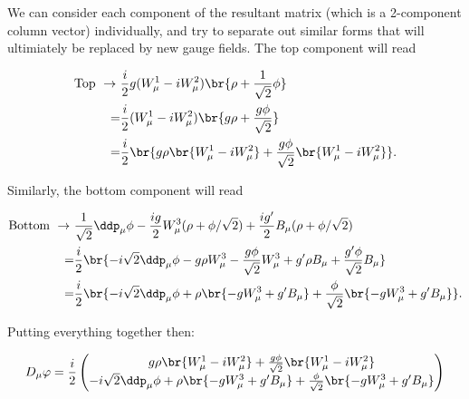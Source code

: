 We can consider each component of the resultant matrix (which is a 2-component column vector) individually, and try to separate out similar forms that will ultimiately be replaced by new gauge fields. The top component will read

\begin{align}
  \mathrm{Top} \ \rightarrow\ &  \frac{i}{2}g (W_\mu^1 - iW_\mu^2)\br{\rho + \frac{1}{\sqrt{2}}\phi} \\
  =& \frac{i}{2} (W_\mu^1 - iW_\mu^2)\br{g\rho + \frac{g\phi}{\sqrt{2}}} \\
  =& \frac{i}{2}\br{g\rho \br{W_\mu^1 - iW_\mu^2} + \frac{g\phi}{\sqrt{2}} \br{W_\mu^1 - iW_\mu^2}}.
\end{align}

Similarly, the bottom component will read

\begin{align}
  \mathrm{Bottom} \ \rightarrow\ & \frac{1}{\sqrt{2}}\ddp_\mu\phi - \frac{ig}{2}W_\mu^3(\rho + \phi/\sqrt{2}) + \frac{ig'}{2}B_\mu(\rho + \phi/\sqrt{2}) \\
  =& \frac{i}{2}\br{-i\sqrt{2}\ddp_\mu\phi - g\rho W_\mu^3 - \frac{g\phi}{\sqrt{2}}W_\mu^3 + g'\rho B_\mu + \frac{g'\phi}{\sqrt{2}}B_\mu} \\
  =& \frac{i}{2}\br{-i\sqrt{2}\ddp_\mu\phi + \rho\br{-gW_\mu^3 + g'B_\mu} + \frac{\phi}{\sqrt{2}}\br{-gW_\mu^3 + g'B_\mu}}.
\end{align}

Putting everything together then:

\begin{equation}
  D_\mu\varphi = \frac{i}{2} \begin{pmatrix}g\rho \br{W_\mu^1 - iW_\mu^2} + \frac{g\phi}{\sqrt{2}} \br{W_\mu^1 - iW_\mu^2} \\ -i\sqrt{2}\ddp_\mu\phi + \rho\br{-gW_\mu^3 + g'B_\mu} + \frac{\phi}{\sqrt{2}}\br{-gW_\mu^3 + g'B_\mu}\end{pmatrix}
\end{equation}




